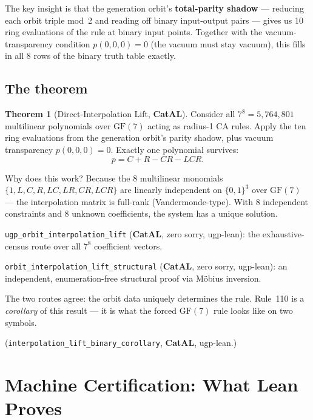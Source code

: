 \documentclass[11pt,a4paper]{article}
\newcommand{\term}[1]{\textbf{#1}}
\newcommand{\lean}[1]{\texttt{#1}}
\newcommand{\CatAL}{\textbf{CatAL}}
\theoremstyle{definition}
\newtheorem{theorem}{Theorem}[section]
\begin{document}
The key insight is that the generation orbit's \term{total-parity shadow} —
reducing each orbit triple mod~2 and reading off binary input-output pairs
— gives us 10 ring evaluations of the rule at binary input points.
Together with the vacuum-transparency condition $p(0,0,0) = 0$ (the vacuum
must stay vacuum), this fills in all 8 rows of the binary truth table exactly.

\subsection{The theorem}

\begin{theorem}[Direct-Interpolation Lift, \CatAL]
Consider all $7^8 = 5{,}764{,}801$ multilinear polynomials over
$\mathrm{GF}(7)$ acting as radius-1 CA rules.  Apply the ten ring
evaluations from the generation orbit's parity shadow, plus vacuum
transparency $p(0,0,0) = 0$.  Exactly one polynomial survives:
\[
  p = C + R - CR - LCR.
\]
\end{theorem}

\noindent
Why does this work?  Because the 8 multilinear monomials $\{1, L, C, R, LC,
LR, CR, LCR\}$ are linearly independent on $\{0,1\}^3$ over $\mathrm{GF}(7)$
— the interpolation matrix is full-rank (Vandermonde-type).  With 8
independent constraints and 8 unknown coefficients, the system has a unique
solution.

\medskip
\lean{ugp\_orbit\_interpolation\_lift} (\CatAL, zero sorry, ugp-lean):
the exhaustive-census route over all $7^8$ coefficient vectors.

\lean{orbit\_interpolation\_lift\_structural} (\CatAL, zero sorry, ugp-lean):
an independent, enumeration-free structural proof via Möbius inversion.

\medskip
The two routes agree: the orbit data uniquely determines the rule.
Rule~110 is a \emph{corollary} of this result — it is what the forced
$\mathrm{GF}(7)$ rule looks like on two symbols.

(\lean{interpolation\_lift\_binary\_corollary}, \CatAL, ugp-lean.)

\section{Machine Certification: What Lean Proves}
\label{sec:lean}
\end{document}
